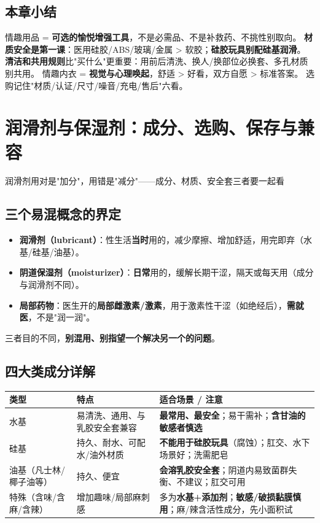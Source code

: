 \documentclass[12pt,UTF8,openany]{ctexbook}
\begin{document}
\section{本章小结}
情趣用品 = \textbf{可选的愉悦增强工具}，不是必需品、不是补救药、不挑性别取向。
\textbf{材质安全是第一课}：医用硅胶/ABS/玻璃/金属 > 软胶；\textbf{硅胶玩具别配硅基润滑}。
\textbf{清洁和共用规则}比"买什么"更重要：用前后清洗、换人/换部位必换套、多孔材质别共用。
情趣内衣 = \textbf{视觉与心理唤起}，舒适 > 好看，双方自愿 > 标准答案。
选购记住"材质/认证/尺寸/噪音/充电/售后"六看。


\chapter{润滑剂与保湿剂：成分、选购、保存与兼容}

\begin{center}
\myhei\large 润滑剂用对是"加分"，用错是"减分"——成分、材质、安全套三者要一起看
\end{center}

\section{三个易混概念的界定}
\begin{itemize}[leftmargin=2em,itemsep=0.3em]
  \item \textbf{润滑剂（lubricant）}：性生活\textbf{当时}用的，减少摩擦、增加舒适，用完即弃（水基/硅基/油基）。
  \item \textbf{阴道保湿剂（moisturizer）}：\textbf{日常}用的，缓解长期干涩，隔天或每天用（成分与润滑剂不同）。
  \item \textbf{局部药物}：医生开的\textbf{局部雌激素/激素}，用于激素性干涩（如绝经后），\textbf{需就医}，不是"润一润"。
\end{itemize}
三者目的不同，\textbf{别混用、别指望一个解决另一个的问题}。

\section{四大类成分详解}
\begin{tabularx}{\textwidth}{X X X}
\toprule
\textbf{类型} & \textbf{特点} & \textbf{适合场景 / 注意} \\
\midrule
水基 & 易清洗、通用、与乳胶安全套兼容 & \textbf{最常用、最安全}；易干需补；\textbf{含甘油的敏感者慎选} \\
硅基 & 持久、耐水、可配水/油外材质 & \textbf{不能用于硅胶玩具}（腐蚀）；肛交、水下场景好；洗需肥皂 \\
油基（凡士林/椰子油等） & 持久、便宜 & \textbf{会溶乳胶安全套}；阴道内易致菌群失衡、不建议；肛交可用 \\
特殊（含味/含麻/含辣） & 增加趣味/局部麻刺感 & 多为\textbf{水基+添加剂}；\textbf{敏感/破损黏膜慎用}；麻/辣含活性成分，先小面积试 \\
\bottomrule
\end{tabularx}
\end{document}
